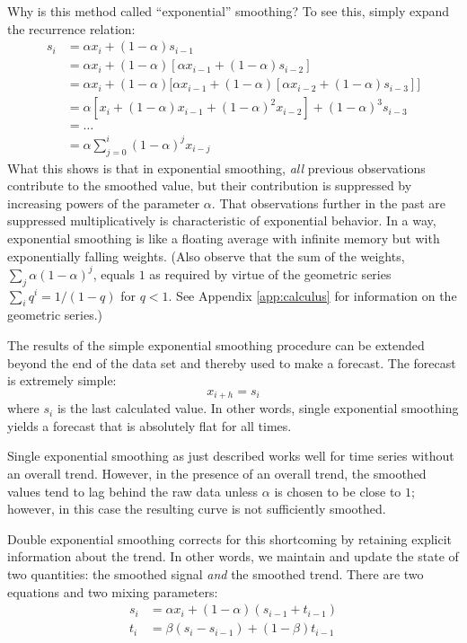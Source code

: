 Why is this method called ``exponential'' smoothing? To see this,
simply expand the recurrence relation:
%
\begin{align*}
  s_i & = \alpha x_i + ( 1 - \alpha ) s_{i-1} \\
      & = \alpha x_i + ( 1 - \alpha ) 
          \left[ \alpha x_{i-1} + ( 1 - \alpha ) s_{i-2} \right] \\
      & = \alpha x_i + ( 1 - \alpha ) 
          \bigl[ \alpha x_{i-1} + ( 1 - \alpha ) 
          \left[ \alpha x_{i-2} + ( 1 - \alpha ) s_{i-3} \right] \bigr] \\
      & = \alpha \left[ x_i + ( 1 - \alpha ) x_{i-1} + 
          ( 1 - \alpha )^2 x_{i-2} \right] + 
          ( 1 - \alpha )^3 s_{i-3} \\
      & = \dots \\
      & = \alpha \sum_{j=0}^{i} ( 1 - \alpha )^j x_{i-j}
\end{align*}
%
What this shows is that in exponential smoothing, \emph{all} previous
observations contribute to the smoothed value, but their contribution
is suppressed by increasing powers of the parameter $\alpha$.  That
observations further in the past are suppressed multiplicatively is
characteristic of exponential behavior.  In a way, exponential
smoothing is like a floating average with infinite memory but with
exponentially falling weights. (Also observe that the sum of the
weights, $\sum_j \alpha ( 1 - \alpha )^j$, equals $1$ as required by
virtue of the geometric series $\sum_i q^i = 1/(1-q)$ for $q < 1$. See
Appendix \ref{app:calculus} for information on the geometric series.)

The results of the simple exponential smoothing procedure can be
extended beyond the end of the data set and thereby used to make a
forecast. The forecast is extremely simple:
%
\[
x_{i+h} = s_i
\]
%
where $s_i$ is the last calculated value. In other words, single
exponential smoothing yields a forecast that is absolutely flat for
all times.

Single exponential smoothing as just described works well for time
series without an overall trend. However, in the presence of an
overall trend, the smoothed values tend to lag behind the raw data
unless $\alpha$ is chosen to be close to $1$; however, in this case
the resulting curve is not sufficiently smoothed.

Double exponential smoothing  corrects for this shortcoming by
retaining explicit information about the trend. In other words, we
maintain and update the state of two quantities: the smoothed signal
\emph{and} the smoothed trend. There are two equations and two mixing
parameters:\vspace*{-6pt}
%
\begin{align*}
  s_i & = \alpha x_i + ( 1 - \alpha ) ( s_{i-1} + t_{i-1} ) \\
  t_i & = \beta ( s_i - s_{i-1} ) + ( 1 - \beta ) t_{i-1}
\end{align*}\vskip-3pt
%

